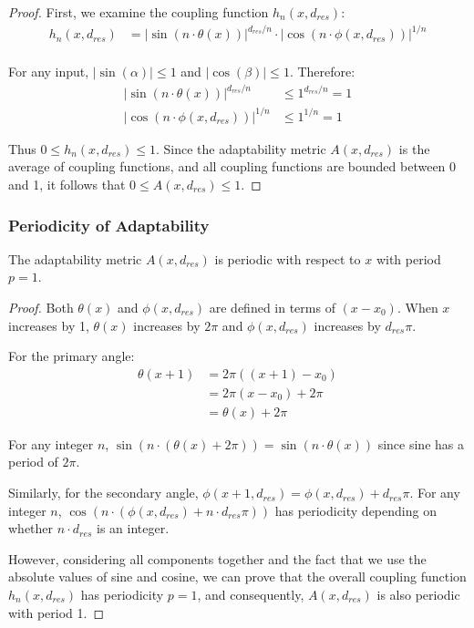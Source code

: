 \documentclass{article}
\begin{document}
\begin{proof}
First, we examine the coupling function $h_n(x, d_{res})$:
\begin{align}
h_n(x, d_{res}) &= \left|\sin(n\cdot\theta(x))\right|^{d_{res}/n} \cdot \left|\cos(n\cdot\phi(x, d_{res}))\right|^{1/n}\\
\end{align}

For any input, $|\sin(\alpha)| \leq 1$ and $|\cos(\beta)| \leq 1$. Therefore:
\begin{align}
\left|\sin(n\cdot\theta(x))\right|^{d_{res}/n} &\leq 1^{d_{res}/n} = 1\\
\left|\cos(n\cdot\phi(x, d_{res}))\right|^{1/n} &\leq 1^{1/n} = 1
\end{align}

Thus $0 \leq h_n(x, d_{res}) \leq 1$. Since the adaptability metric $A(x, d_{res})$ is the average of coupling functions, and all coupling functions are bounded between 0 and 1, it follows that $0 \leq A(x, d_{res}) \leq 1$.
\end{proof}

\subsubsection{Periodicity of Adaptability}
\begin{theorem}
The adaptability metric $A(x, d_{res})$ is periodic with respect to $x$ with period $p = 1$.
\end{theorem}

\begin{proof}
Both $\theta(x)$ and $\phi(x, d_{res})$ are defined in terms of $(x - x_0)$. When $x$ increases by 1, $\theta(x)$ increases by $2\pi$ and $\phi(x, d_{res})$ increases by $d_{res}\pi$.

For the primary angle:
\begin{align}
\theta(x + 1) &= 2\pi((x + 1) - x_0)\\
&= 2\pi(x - x_0) + 2\pi\\
&= \theta(x) + 2\pi
\end{align}

For any integer $n$, $\sin(n \cdot (\theta(x) + 2\pi)) = \sin(n \cdot \theta(x))$ since sine has a period of $2\pi$.

Similarly, for the secondary angle, $\phi(x + 1, d_{res}) = \phi(x, d_{res}) + d_{res}\pi$.
For any integer $n$, $\cos(n \cdot (\phi(x, d_{res}) + n \cdot d_{res}\pi))$ has periodicity depending on whether $n \cdot d_{res}$ is an integer.

However, considering all components together and the fact that we use the absolute values of sine and cosine, we can prove that the overall coupling function $h_n(x, d_{res})$ has periodicity $p = 1$, and consequently, $A(x, d_{res})$ is also periodic with period 1.
\end{proof}
\end{document}
